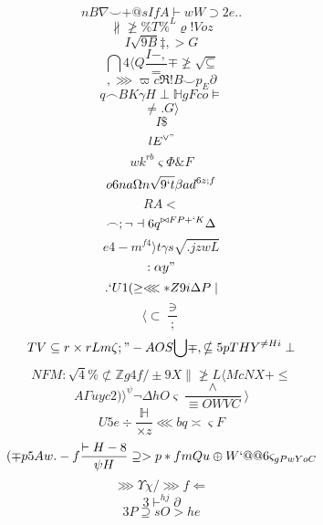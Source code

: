 \documentclass[12pt]{article}
\begin{document}
        \begin{minipage}[t][0pt]{\linewidth}

        \[nB {\nabla}\smile + @ s I f A\vdash w W\supset 2 e . .\]
\[\nparallel\ngeq\% T\%^{L}\varrho ! V o z\]
\[I\sqrt{9B}\ddagger , > G\]
\[\bigcap {4}\langle Q\frac{I-,}{=}\mp\ngeq\sqrt{\subseteq}\]
\[,\ggg\varpi c\Re ! B\smile p_{E}\partial\]
\[q\frown B K\gamma H\perp\mathbb{H} g F c o\models\]
\[\neq . G\rangle\]
\[I\$\]
\[lE^{\lor "}\]
\[wk^{rb}\varsigma\Phi\& F\]
\[o6na\Omega n\sqrt{9`t}\beta a d^{6z;f}\]
\[RA<\]
\[\frown ;\neg\dashv 6 q^{\bowtie F P + ` K}\Delta\]
\[e4-m^{f4}\rangle t\gamma s\sqrt{.jzwL}\]
\[:\alpha y "\]
\[.`U1(\geq\lll * Z 9 i\Delta P\mid\]
\[\langle\subset\frac{\ni}{ ;}\]
\[TV\subseteq r\times r L m\zeta ; " - A O S {\bigcup}\mp ,\nsubseteq 5 p T H Y^{\neq H i}\perp\]
\[NFM:\sqrt{4}\%\not\subset\mathbb{Z} g 4 f /\pm 9 X\parallel\ngeq L\langle M c N X +\leq\]
\[A\Gamma u y c {2)}\rangle^{\psi}\neg\Delta h O\varsigma\frac{\land}{\equiv O W V C}\rangle\]
\[U5e\div\frac{\mathbb{H}}{\times z}\lll b q\asymp\varsigma F\]
\[(\mp p 5 A w . - f\frac{\vdash H - 8}{\psi H}\supseteq > p * f m Q u\oplus W ` @ @ 6\varsigma_{gPwYoC}\]
\[\ggg\Upsilon\chi /\ggg f\Leftarrow\]
\[3\vdash^{hj}\partial\]
\[3P\supseteq s O {>h e}
        \]
\end{minipage}
\end{document}
